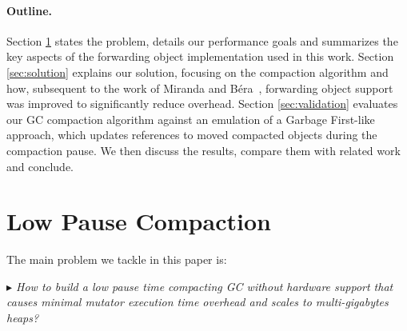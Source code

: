 \documentclass[sigplan,10pt,review,anonymous]{acmart}\settopmatter{printfolios=true,printccs=false,printacmref=false}
\newcommand{\cba}[1]{\color{purple}\fbox{\bfseries\sffamily\scriptsize Clement:}{\sf\small$\blacktriangleright$\textit{#1}$\blacktriangleleft$}\color{black}}
\begin{document}
\paragraph{Outline.}
Section \ref{sec:problem} states the problem, details our performance goals and summarizes the key aspects of the forwarding object implementation used in this work. Section \ref{sec:solution} explains our solution, focusing on the compaction algorithm and how, subsequent to the work of Miranda and B\'era~\cite{Forwarders}, forwarding object support was improved to significantly reduce overhead. Section \ref{sec:validation} evaluates our GC compaction algorithm against an emulation of a Garbage First-like approach, which updates references to moved compacted objects during the compaction pause. We then discuss the results, compare them with related work and conclude.

\section{Low Pause Compaction}
\label{sec:problem}


The main problem we tackle in this paper is: 

\emph{$\blacktriangleright$ How to build a low pause time compacting GC without hardware support that causes minimal mutator execution time overhead and scales to multi-gigabytes heaps?} 


\end{document}
